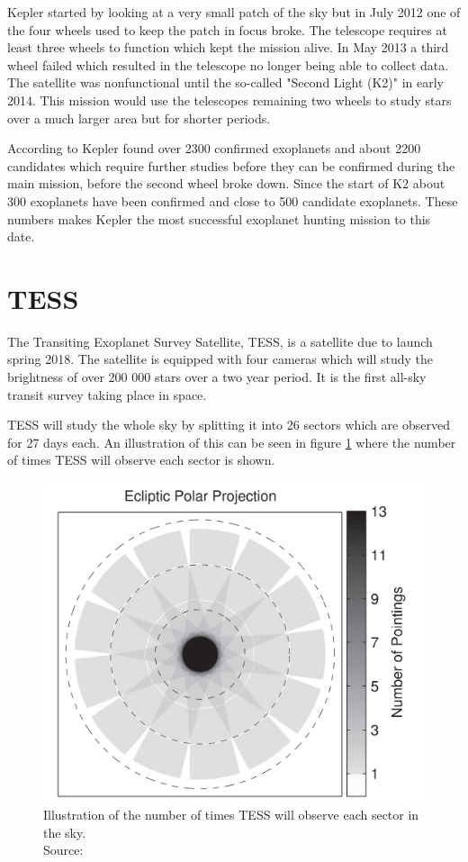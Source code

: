 \documentclass[12pt]{report}
\begin{document}
	Kepler started by looking at a very small patch of the sky but in July 2012 one of the four wheels used to keep the patch in focus broke. The telescope requires at least three wheels to function which kept the mission alive. In May 2013 a third wheel failed which resulted in the telescope no longer being able to collect data. The satellite was nonfunctional until the so-called "Second Light (K2)" in early 2014. This mission would use the telescopes remaining two wheels to study stars over a much larger area but for shorter periods.
	
	According to \cite{kepler_num_planet} Kepler found over 2300 confirmed exoplanets and about 2200 candidates which require further studies before they can be confirmed during the main mission, before the second wheel broke down. Since the start of K2 about 300 exoplanets have been confirmed and close to 500 candidate exoplanets. These numbers makes Kepler the most successful exoplanet hunting mission to this date.
	
	
\section{TESS}
	The Transiting Exoplanet Survey Satellite, TESS, is a satellite due to launch spring 2018. The satellite is equipped with four cameras which will study the brightness of over 200 000 stars over a two year period. It is the first all-sky transit survey taking place in space.
	
	TESS will study the whole sky by splitting it into 26 sectors which are observed for 27 days each. An illustration of this can be seen in figure \ref{fig:tess_time} where the number of times TESS will observe each sector is shown. 
	\begin{figure}[h!]
	\centering
		\includegraphics[scale=0.2]{img/tess_observe_time.png}
		\caption{Illustration of the number of times TESS will observe each sector in the sky.\\ \small{Source: \cite{2015ApJ...809...77S}}}
		\label{fig:tess_time}
	\end{figure}
	
\end{document}

